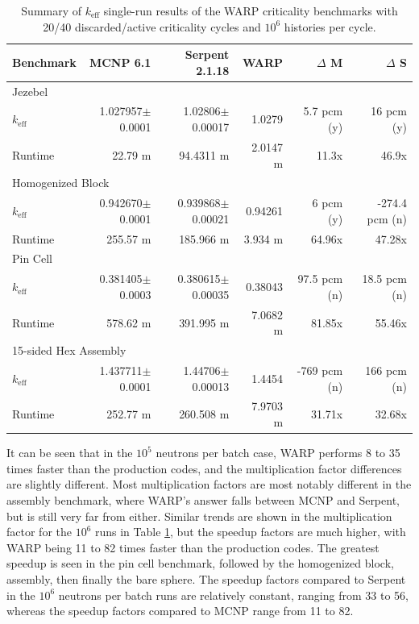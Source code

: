 \begin{table}[h]
\centering
\caption{Summary of $k_\mathrm{eff}$ single-run results of the WARP criticality benchmarks with 20/40 discarded/active criticality cycles and $10^6$ histories per cycle.}
\label{benchmark_summary_6}
\begin{tabular}{| l | r | r | r | r | r |}
 \hline
 Benchmark & MCNP 6.1 & Serpent 2.1.18 & WARP & $\Delta$ M & $\Delta$ S  \\
\hline
\hline
\multicolumn{6}{|l|}{Jezebel}  \\
\hline
 $k_\mathrm{eff}$ & 1.027957$\pm$0.0001 & 1.02806$\pm$0.00017 & 1.0279 & 5.7 pcm (y)& 16 pcm  (y) \\
 \hline
 Runtime               & 22.79 m & 94.4311 m &  2.0147 m & 11.3x  & 46.9x  \\
 \hline
 \hline
\multicolumn{6}{|l|}{Homogenized Block }\\
\hline
 $k_\mathrm{eff}$ & 0.942670$\pm$0.0001 & 0.939868$\pm$0.00021 & 0.94261 & 6 pcm (y) &  -274.4 pcm (n)  \\
 \hline
 Runtime               & 255.57 m & 185.966 m & 3.934 m & 64.96x & 47.28x  \\
 \hline
  \hline
\multicolumn{6}{|l|}{Pin Cell}\\
\hline
 $k_\mathrm{eff}$ & 0.381405$\pm$0.0003 & 0.380615$\pm$0.00035 & 0.38043 & 97.5 pcm (n) &  18.5 pcm (n)  \\
 \hline
 Runtime               & 578.62 m & 391.995 m & 7.0682 m & 81.85x & 55.46x \\
 \hline
  \hline
\multicolumn{6}{|l|}{15-sided Hex Assembly}\\
\hline
 $k_\mathrm{eff}$ & 1.437711$\pm$0.0001 & 1.44706$\pm$0.00013 & 1.4454 & -769 pcm (n) &  166 pcm (n) \\
 \hline
 Runtime               & 252.77 m & 260.508 m & 7.9703 m & 31.71x & 32.68x \\
 \hline
\end{tabular}
\end{table}

It can be seen that in the $10^5$ neutrons per batch case, WARP performs 8 to 35 times faster than the production codes, and the multiplication factor differences are slightly different.  Most multiplication factors are most notably different in the assembly benchmark, where WARP's answer falls between MCNP and Serpent, but is still very far from either.  Similar trends are shown in the multiplication factor for the $10^6$ runs in Table \ref{benchmark_summary_6}, but the speedup factors are much higher, with WARP being 11 to 82 times faster than the production codes.   The greatest speedup is seen in the pin cell benchmark, followed by the homogenized block, assembly, then finally the bare sphere.  The speedup factors compared to Serpent in the $10^6$ neutrons per batch runs are relatively constant, ranging from 33 to 56, whereas the speedup factors compared to MCNP range from 11 to 82.

